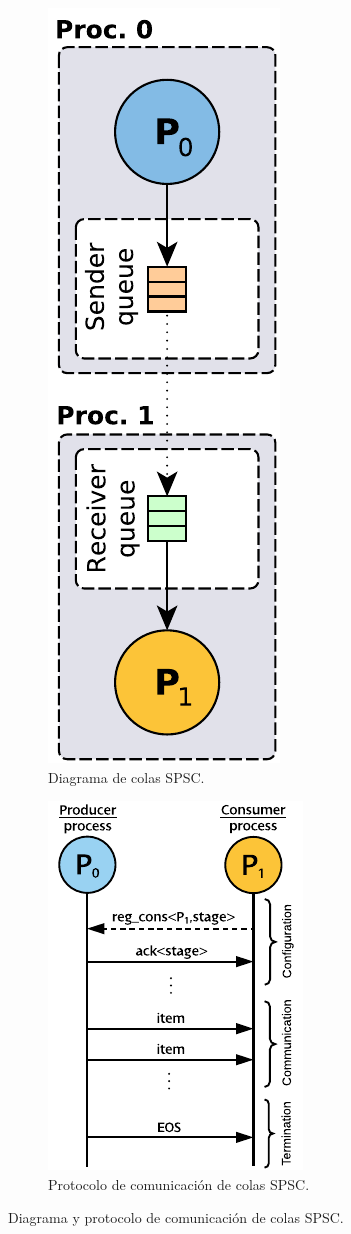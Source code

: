 \vspace{0.35cm}
\begin{figure}[!tbp]
\centering
\begin{subfigure}[b]{.5\textwidth}
  \centering
  \includegraphics[width=0.3\linewidth]{figures/mpi-spsc-queue.pdf}
  \caption{Diagrama de colas SPSC.}
\end{subfigure}%
\hfill
\begin{subfigure}[b]{.5\textwidth}
  \centering
  \includegraphics[width=0.5\linewidth]{figures/mpi-spsc-communication.pdf}
  \caption{Protocolo de comunicación de colas SPSC.}
\end{subfigure}
\caption{Diagrama y protocolo de comunicación de colas SPSC.}
\label{fig:spsc-queue}
\end{figure}
\vspace{0.35cm}

